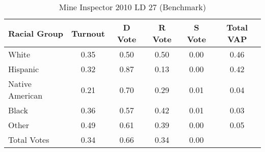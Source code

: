 \begin{table}[htb]
\begin{center}
\caption{Mine Inspector 2010 LD 27 (Benchmark)}
\label{smine_vap_ld_27_benchmark}
\begin{tabular}{lccccc}
  \hline
Racial Group & Turnout & D Vote & R Vote & S Vote & Total VAP \\ 
  \hline
White & 0.35 & 0.50 & 0.50 & 0.00 & 0.46 \\ 
  Hispanic & 0.32 & 0.87 & 0.13 & 0.00 & 0.42 \\ 
  Native American & 0.21 & 0.70 & 0.29 & 0.01 & 0.04 \\ 
  Black & 0.36 & 0.57 & 0.42 & 0.01 & 0.03 \\ 
  Other & 0.49 & 0.61 & 0.39 & 0.00 & 0.05 \\ 
  Total Votes & 0.34 & 0.66 & 0.34 & 0.00 &  \\ 
   \hline
\end{tabular}
\end{center}
\end{table}
